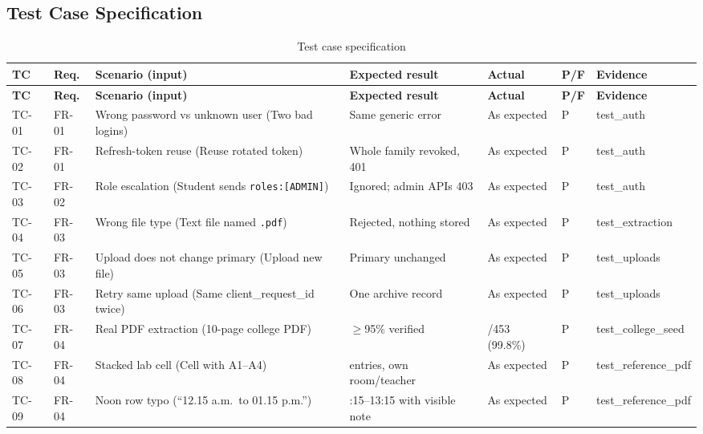 \subsection{Test Case Specification}
\begingroup\footnotesize
\setlength{\tabcolsep}{3pt}
\begin{longtable}{@{}p{1.15cm}p{1.2cm}>{\raggedright\arraybackslash}p{4.4cm}>{\raggedright\arraybackslash}p{3.6cm}>{\raggedright\arraybackslash}p{2.1cm}p{0.6cm}>{\raggedright\arraybackslash}p{2.3cm}@{}}
\caption{Test case specification}\label{tab:testcases}\\
\toprule
\textbf{TC} & \textbf{Req.} & \textbf{Scenario (input)} & \textbf{Expected result} & \textbf{Actual} & \textbf{P/F} & \textbf{Evidence}\\
\midrule
\endfirsthead
\toprule
\textbf{TC} & \textbf{Req.} & \textbf{Scenario (input)} & \textbf{Expected result} & \textbf{Actual} & \textbf{P/F} & \textbf{Evidence}\\
\midrule
\endhead
TC-01 & FR-01 & Wrong password vs unknown user (Two bad logins) & Same generic error & As expected & P & test\_\allowbreak{}auth\\
TC-02 & FR-01 & Refresh-token reuse (Reuse rotated token) & Whole family revoked, 401 & As expected & P & test\_\allowbreak{}auth\\
TC-03 & FR-02 & Role escalation (Student sends \texttt{roles:[ADMIN]}) & Ignored; admin APIs 403 & As expected & P & test\_\allowbreak{}auth\\
TC-04 & FR-03 & Wrong file type (Text file named \texttt{.pdf}) & Rejected, nothing stored & As expected & P & test\_\allowbreak{}extraction\\
TC-05 & FR-03 & Upload does not change primary (Upload new file) & Primary unchanged & As expected & P & test\_\allowbreak{}uploads\\
TC-06 & FR-03 & Retry same upload (Same client\_\allowbreak{}request\_\allowbreak{}id twice) & One archive record & As expected & P & test\_\allowbreak{}uploads\\
TC-07 & FR-04 & Real PDF extraction (10-page college PDF) & $\geq$95\% verified & 452/453 (99.8\%) & P & test\_\allowbreak{}college\_\allowbreak{}seed\\
TC-08 & FR-04 & Stacked lab cell (Cell with A1--A4) & 4 entries, own room/teacher & As expected & P & test\_\allowbreak{}reference\_\allowbreak{}pdf\\
TC-09 & FR-04 & Noon row typo (``12.15 a.m.\ to 01.15 p.m.'') & 12:15--13:15 with visible note & As expected & P & test\_\allowbreak{}reference\_\allowbreak{}pdf\\

\end{longtable}
